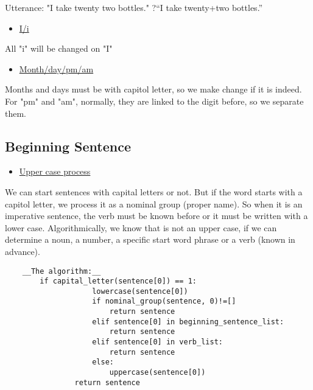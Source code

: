 \documentclass[twoside,a4paper,10pt]{report}
\begin{document}
\small
\begin{verbatimtab}
  Utterance: "I take twenty two bottles."
  ?“I take twenty+two bottles.”
\end{verbatimtab}
\normalsize

\begin{itemize}
    \item  \underline{I/i}
\end{itemize}
All "i" will be changed on "I"



\begin{itemize}
    \item  \underline{Month/day/pm/am}
\end{itemize}
Months and days must be with capitol letter, so we make change if it is indeed. For "pm" and "am", normally, they are linked to the digit before, so we separate them.


\subsection{Beginning Sentence}
\label{194989f378cb64e64758160f2e624d3f}%

\begin{itemize}
    \item  \underline{Upper case process}
\end{itemize}
We can start sentences with capital letters or not. But if the word starts with a capitol letter, we process it as a nominal group (proper name). So when it is an imperative sentence, the verb must be known before or it must be written with a lower case.
Algorithmically, we know that is not an upper case, if we can determine a noun, a number, a specific start word phrase or a verb (known in advance).



\lstset{language=python}
\begin{lstlisting}
	__The algorithm:__
		if capital_letter(sentence[0]) == 1:
                    lowercase(sentence[0])
                    if nominal_group(sentence, 0)!=[]
                        return sentence
                    elif sentence[0] in beginning_sentence_list:
                        return sentence
                    elif sentence[0] in verb_list:
                        return sentence
                    else:
                        uppercase(sentence[0])
                return sentence

\end{lstlisting}
\end{document}
